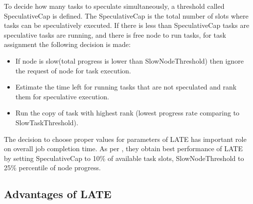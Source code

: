  To decide how many tasks to speculate simultaneously, a threshold called SpeculativeCap is defined. The SpeculativeCap is the total number of slots where tasks can be speculatively executed. If there is less than SpeculativeCap tasks are speculative tasks are running, and there is free node to run tasks, for task assignment the following decision is made:\\
 \begin{itemize}
 \item{If node is slow(total progress is lower than SlowNodeThreshold) then ignore the request of node for task execution.}
 \item{Estimate the time left for running tasks that are not speculated and rank them for speculative execution.}
 \item{Run the copy of task with highest rank (lowest progress rate comparing to SlowTaskThreshold). }
  
 \end{itemize}

 
 The decision to choose proper values for parameters of LATE‌ has important role on overall job completion time. As per \cite{mat1}, they obtain best performance of LATE by setting SpeculativeCap to 10\% of available task slots, SlowNodeThreshold to 25\% percentile of node progress. 
 

 
\subsection{Advantages of LATE}

